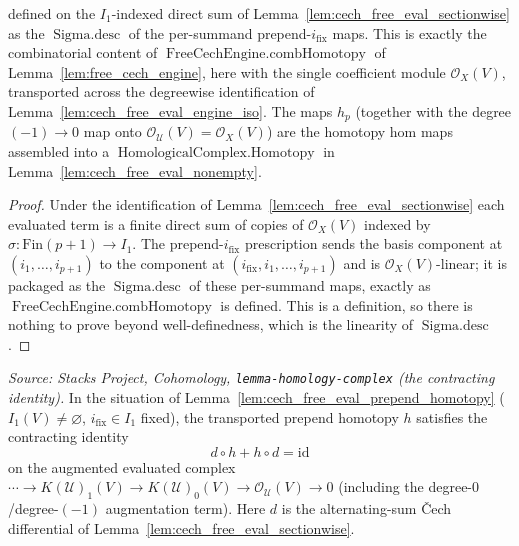 \begin{lemma}
\[  \]
  defined on the \(I_1\)-indexed direct sum of
  Lemma~\ref{lem:cech_free_eval_sectionwise} as the \(\operatorname{Sigma.desc}\) of
  the per-summand prepend-\(i_{\mathrm{fix}}\) maps. This is exactly the
  combinatorial content of \(\operatorname{FreeCechEngine.combHomotopy}\) of
  Lemma~\ref{lem:free_cech_engine}, here with the single
  coefficient module \(\mathcal{O}_X(V)\), transported across the degreewise
  identification of Lemma~\ref{lem:cech_free_eval_engine_iso}. The maps \(h_p\) (together with the
  degree \((-1)\!\to\!0\) map onto \(\mathcal{O}_{\mathcal{U}}(V) = \mathcal{O}_X(V)\))
  are the homotopy hom maps assembled into a
  \(\operatorname{HomologicalComplex.Homotopy}\) in
  Lemma~\ref{lem:cech_free_eval_nonempty}.
\end{lemma}

\begin{proof}
  Under the identification of Lemma~\ref{lem:cech_free_eval_sectionwise} each
  evaluated term is a finite direct sum of copies of \(\mathcal{O}_X(V)\) indexed by
  \(\sigma : \mathrm{Fin}(p+1) \to I_1\). The prepend-\(i_{\mathrm{fix}}\) prescription
  sends the basis component at \((i_1, \ldots, i_{p+1})\) to the component at
  \((i_{\mathrm{fix}}, i_1, \ldots, i_{p+1})\) and is \(\mathcal{O}_X(V)\)-linear; it is
  packaged as the \(\operatorname{Sigma.desc}\) of these per-summand maps, exactly as
  \(\operatorname{FreeCechEngine.combHomotopy}\) is defined. This is a definition,
  so there is nothing to prove beyond well-definedness, which is the linearity of
  \(\operatorname{Sigma.desc}\).
\end{proof}

\begin{lemma}
  \label{lem:cech_free_eval_prepend_homotopy_spec}
  \textit{Source: Stacks Project, Cohomology, \texttt{lemma-homology-complex}
  (the contracting identity).}
  In the situation of Lemma~\ref{lem:cech_free_eval_prepend_homotopy}
  (\(I_1(V) \neq \varnothing\), \(i_{\mathrm{fix}} \in I_1\) fixed), the transported
  prepend homotopy \(h\) satisfies the contracting identity
  \[
    d \circ h + h \circ d = \mathrm{id}
  \]
  on the augmented evaluated complex
  \(\cdots \to K(\mathcal{U})_1(V) \to K(\mathcal{U})_0(V) \to
  \mathcal{O}_{\mathcal{U}}(V) \to 0\) (including the degree-\(0\)/degree-\((-1)\)
  augmentation term). Here \(d\) is the alternating-sum {\v C}ech differential of
  Lemma~\ref{lem:cech_free_eval_sectionwise}.
\end{lemma}

